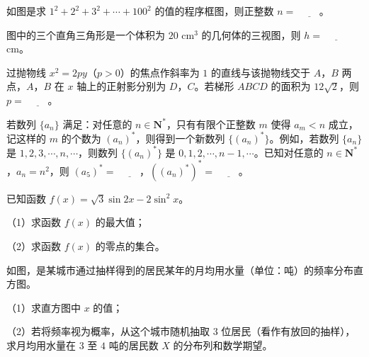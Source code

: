 \begingroup
\renewenvironment{question}{\Needspace{0.5\textheight}}{}
\begin{question}
如图是求 $1^2+2^2+3^2+\cdots+100^2$ 的值的程序框图，则正整数 $n=$ $\underline{\qquad}$。
\nopagebreak[4]
\begin{center}\end{center}
\nopagebreak[4]
\Needspace{0.4\textheight}
\end{question}
\endgroup
\begingroup
\renewenvironment{question}{\Needspace{0.5\textheight}}{}
\begin{question}
图中的三个直角三角形是一个体积为 $20$ cm$^3$ 的几何体的三视图，则 $h=$ $\underline{\qquad}$ cm。
\nopagebreak[4]
\begin{center}\end{center}
\nopagebreak[4]
\end{question}
\endgroup
\begin{question}
过抛物线 $x^2=2py$（$p>0$）的焦点作斜率为 $1$ 的直线与该抛物线交于 $A$，$B$ 两点，$A$，$B$ 在 $x$ 轴上的正射影分别为 $D$，$C$。若梯形 $ABCD$ 的面积为 $12\sqrt2$，则 $p=$ $\underline{\qquad}$。

\end{question}
\begin{question}
若数列 $\{a_n\}$ 满足：对任意的 $n\in\mathbf N^*$，只有有限个正整数 $m$ 使得 $a_m<n$ 成立，记这样的 $m$ 的个数为 $(a_n)^*$，则得到一个新数列 $\{(a_n)^*\}$。例如，若数列 $\{a_n\}$ 是 $1,2,3,\cdots,n,\cdots$，则数列 $\{(a_n)^*\}$ 是 $0,1,2,\cdots,n-1,\cdots$。已知对任意的 $n\in\mathbf N^*$，$a_n=n^2$，则 $(a_5)^*=$ $\underline{\qquad}$，$((a_n)^*)^*=$ $\underline{\qquad}$。

\end{question}
\begin{question}
已知函数 $f(x)=\sqrt3\sin2x-2\sin^2x$。

（1）求函数 $f(x)$ 的最大值；

（2）求函数 $f(x)$ 的零点的集合。

\Needspace{0.4\textheight}
\end{question}
\begingroup
\renewenvironment{question}{\Needspace{0.5\textheight}}{}
\begin{question}
如图，是某城市通过抽样得到的居民某年的月均用水量（单位：吨）的频率分布直方图。

（1）求直方图中 $x$ 的值；

（2）若将频率视为概率，从这个城市随机抽取 $3$ 位居民（看作有放回的抽样），求月均用水量在 $3$ 至 $4$ 吨的居民数 $X$ 的分布列和数学期望。
\nopagebreak[4]
\begin{center}\end{center}
\nopagebreak[4]
\Needspace{0.4\textheight}
\end{question}
